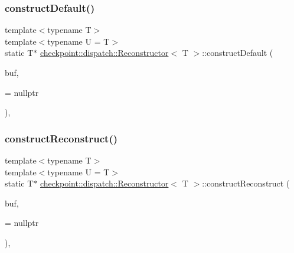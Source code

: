 \mbox{\label{structcheckpoint_1_1dispatch_1_1_reconstructor_a74ded346aaee98f25dc498322e6e1411}} 
\subsubsection{\texorpdfstring{construct\+Default()}{constructDefault()}\hspace{0.1cm}{\footnotesize\ttfamily [2/2]}}
{\footnotesize\ttfamily template$<$typename T$>$ \\
template$<$typename U  = T$>$ \\
static T$\ast$ \hyperlink{structcheckpoint_1_1dispatch_1_1_reconstructor}{checkpoint\+::dispatch\+::\+Reconstructor}$<$ T $>$\+::construct\+Default (\begin{DoxyParamCaption}\item[{void $\ast$}]{buf,  }\item[{\hyperlink{namespacecheckpoint_a4032c86e7c92702198dd675a2696ee2c}{is\+Not\+Default\+Cons\+Type}$<$ U $>$ $\ast$}]{ = {\ttfamily nullptr} }\end{DoxyParamCaption})\hspace{0.3cm}{\ttfamily [inline]}, {\ttfamily [static]}}

\mbox{\label{structcheckpoint_1_1dispatch_1_1_reconstructor_a86a95e9ca24e30a627ed6626f19db4a2}} 
\subsubsection{\texorpdfstring{construct\+Reconstruct()}{constructReconstruct()}\hspace{0.1cm}{\footnotesize\ttfamily [1/3]}}
{\footnotesize\ttfamily template$<$typename T$>$ \\
template$<$typename U  = T$>$ \\
static T$\ast$ \hyperlink{structcheckpoint_1_1dispatch_1_1_reconstructor}{checkpoint\+::dispatch\+::\+Reconstructor}$<$ T $>$\+::construct\+Reconstruct (\begin{DoxyParamCaption}\item[{void $\ast$}]{buf,  }\item[{\hyperlink{namespacecheckpoint_a126da7cae6bbbec231bb2552dc3ad6cc}{is\+Reconstructible\+Type}$<$ U $>$ $\ast$}]{ = {\ttfamily nullptr} }\end{DoxyParamCaption})\hspace{0.3cm}{\ttfamily [inline]}, {\ttfamily [static]}}

